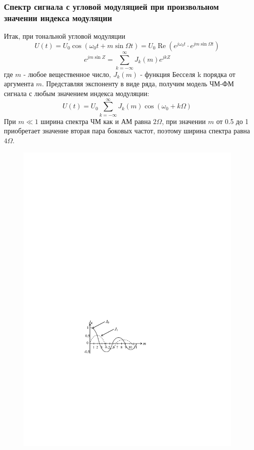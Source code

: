 \documentclass[a4paper,12pt]{article}
\begin{document}
\subsubsection{Спектр сигнала с угловой модуляцией при произвольном значении индекса модуляции}
Итак, при тональной угловой модуляции
\begin{equation}
	U(t)=U_{0} \cos \left(\omega_{0} t+m \sin \Omega t\right)=U_{0} \operatorname{Re}\left(e^{j \omega_{0} t} \cdot e^{j m \sin \Omega t}\right)
\end{equation}
\begin{equation}
	e^{j m \sin Z}=\sum_{k=-\infty}^{\infty} J_{k}(m) e^{j k Z}
\end{equation}
где $m$ - любое вещественное число, $J_{k}(m)$ - функция Бесселя k порядка от аргумента $m$. 
Представляя экспоненту в виде ряда, получим модель ЧМ-ФМ сигнала  с любым значением индекса модуляции:
\begin{equation}
	U(t)=U_{0} \sum_{k=-\infty}^{\infty} J_{k}(m) \cos \left(\omega_{0}+k \Omega\right)
\end{equation}
При $m\ll 1$ ширина спектра ЧМ как и АМ равна $2\Omega$, при значении $m$ от 0.5 до 1 приобретает значение вторая пара боковых частот, поэтому ширина спектра равна $4\Omega$.
\begin{figure}[H]
	\centering
	\includegraphics[]{fig/fig2-5}
	\caption{}
	\label{fig:2.5}
\end{figure}
\end{document}
